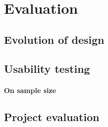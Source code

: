 \chapter{Evaluation}\label{chap:evaluation}

\section{Evolution of design}


\section{Usability testing}

\cite{rubin2008handbook, dumas1999practical}

\subsubsection*{On sample size}
\cite{faulkner2003beyond}

\section{Project evaluation}

